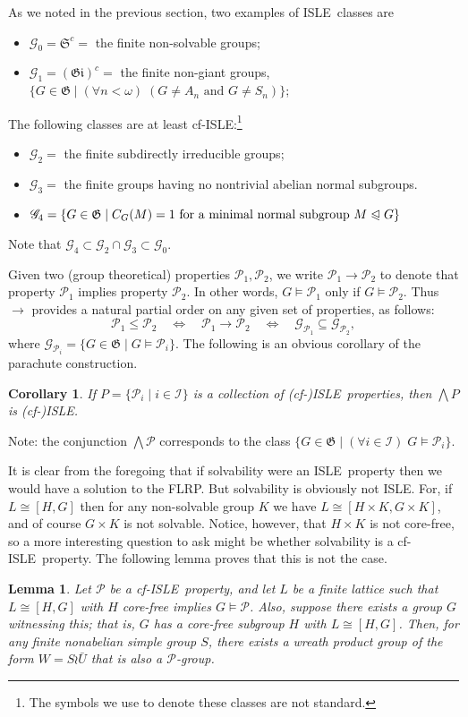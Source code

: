 \documentclass[cm,dissertation]{uhthesis}
\theoremstyle{plain}
\newtheorem{corollary}[theorem]{Corollary}
\newtheorem{lemma}[theorem]{Lemma}
\theoremstyle{definition}
\theoremstyle{remark}
\numberwithin{theorem}{section}
\numberwithin{claim}{chapter}
\numberwithin{equation}{section}
\numberwithin{conjecture}{chapter}
\newcommand{\<}{\ensuremath{\langle}}
\renewcommand{\>}{\ensuremath{\rangle}}
\renewcommand{\leq}{\ensuremath{\leqslant}}
\newcommand{\subnormal}{\ensuremath{\trianglelefteqslant}}
\newcommand{\Meet}{\ensuremath{\bigwedge}}
\newcommand{\FLRP}{{\small FLRP}}
\newcommand{\0}{\ensuremath{\mathbf{0}}}
\newcommand{\1}{\ensuremath{\mathbf{1}}}
\newcommand{\2}{\ensuremath{\mathbf{2}}}
\newcommand{\3}{\ensuremath{\mathbf{3}}}
\newcommand{\4}{\ensuremath{\mathbf{4}}}
\newcommand{\5}{\ensuremath{\mathbf{5}}}
\newcommand{\sG}{\ensuremath{\mathscr{G}}}
\newcommand{\G}{\ensuremath{\mathfrak{G}}}
\newcommand{\sI}{\ensuremath{\mathscr{I}}}
\newcommand{\cP}{\ensuremath{\mathcal{P}}}
\renewcommand{\iff}{\ensuremath{\quad \Leftrightarrow \quad}}
\newcommand{\ISLE}{{\small ISLE}}
\begin{document}
\vskip2mm

As we noted in the previous section, two examples of \ISLE\ classes are
\begin{itemize}
\item $\sG_0 = \mathfrak{S}^c = $ the finite non-solvable groups;
\item $\sG_1 =(\mathfrak{Gi})^c = $ the finite non-giant groups, 
$\{G\in \G \mid (\forall n<\omega) \; (G \neq A_n \text{ and }  G\neq S_n) \}$;
\end{itemize}
The following classes are at least cf-\ISLE:\footnote{The symbols we use to denote these classes are not standard.}
\begin{itemize}
\item $\sG_2 = $ the finite subdirectly irreducible groups;
\item $\sG_3 = $ the finite groups having no nontrivial abelian normal subgroups.
\item $\sG_4 = \{G\in \G \mid C_G(M) = 1 \text{ for a minimal normal
  subgroup } M\subnormal G\}$
\end{itemize}
Note that $\sG_4 \subset \sG_2\cap \sG_3 \subset \sG_0$.

Given two (group theoretical) properties $\cP_1, \cP_2$, we write
$\cP_1 \rightarrow \cP_2$ to denote that property 
$\cP_1$ implies property $\cP_2$. In other words,
$G\vDash \cP_1$ only if $G\vDash \cP_2$.
Thus $\rightarrow$ provides a natural partial order on any given set of 
properties, as follows:
\[
\cP_1 \leq \cP_2  \iff \cP_1 \rightarrow \cP_2 \iff \sG_{\cP_1}\subseteq
\sG_{\cP_2},
\]
where $\sG_{\cP_i} = \{G\in \G \mid G\vDash \cP_i\}$.
The following is an obvious corollary of the parachute construction. %
\begin{corollary}
\label{cor:isle-prop-groups-1}
  If $P = \{\cP_i \mid i\in \sI\}$ is a collection of (cf-)\ISLE\ properties,
  then $\Meet P$ is (cf-)\ISLE.
\end{corollary}
Note: the conjunction $\Meet \cP$ corresponds to the class $\{G \in \G \mid (\forall i \in \sI) \; G\vDash \cP_i \}$.

It is clear from the foregoing that if solvability were an \ISLE\ property then
we would have a solution to the \FLRP.  But solvability is obviously not \ISLE.
For, if $L\cong [H, G]$ then for any non-solvable group $K$ we have $L\cong
[H\times K, G\times K]$, and of course $G\times K$ is not solvable.  
Notice, however, that $H\times K$ is not core-free, so a more interesting
question to ask might be whether solvability is a cf-\ISLE\ property. 
The following lemma proves that this is not the case.  
\begin{lemma}
  \label{lem:ISLE-must-have-wreaths}
Let $\cP$ be a cf-\ISLE\ property, and let $L$ be a finite lattice such that 
$L\cong [H,G]$ with $H$ core-free implies $G\vDash \cP$.  Also, suppose there
exists a group $G$ witnessing this; that is, $G$ has a core-free subgroup
$H$ with $L\cong [H,G]$.   
Then, for any finite nonabelian simple group $S$, there exists a wreath product group
of the form $W = S\wr \bar{U}$ that is also a $\cP$-group.
\end{lemma}
\end{document}

